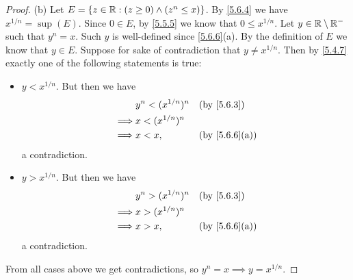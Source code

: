 \begin{proof}{(b)}
  Let \(E = \{z \in \mathbb{R} : (z \geq 0) \land (z^n \leq x)\}\).
  By \cref{5.6.4} we have \(x^{1 / n} = \sup(E)\).
  Since \(0 \in E\), by \cref{5.5.5} we know that \(0 \leq x^{1 / n}\).
  Let \(y \in \mathbb{R} \setminus \mathbb{R}^-\) such that \(y^n = x\).
  Such \(y\) is well-defined since \cref{5.6.6}(a).
  By the definition of \(E\) we know that \(y \in E\).
  Suppose for sake of contradiction that \(y \neq x^{1 / n}\).
  Then by \cref{5.4.7} exactly one of the following statements is true:
  \begin{itemize}
    \item \(y < x^{1 / n}\).
          But then we have
          \begin{align*}
                     & y^n < (x^{1 / n})^n &  & \text{(by \cref{5.6.3})}    \\
            \implies & x < (x^{1 / n})^n                                    \\
            \implies & x < x,              &  & \text{(by \cref{5.6.6}(a))}
          \end{align*}
          a contradiction.
    \item \(y > x^{1 / n}\).
          But then we have
          \begin{align*}
                     & y^n > (x^{1 / n})^n &  & \text{(by \cref{5.6.3})}    \\
            \implies & x > (x^{1 / n})^n                                    \\
            \implies & x > x,              &  & \text{(by \cref{5.6.6}(a))}
          \end{align*}
          a contradiction.
  \end{itemize}
  From all cases above we get contradictions, so \(y^n = x \implies y = x^{1 / n}\).
\end{proof}

